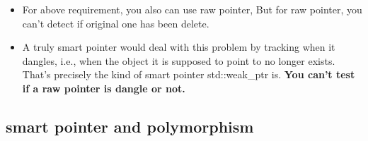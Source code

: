 \documentclass[a4paper,12pt,twoside]{book}
\begin{document}
\begin{itemize}
\item For above requirement, you also can use raw pointer, But for raw pointer, you can't detect if original one has been delete. 

\item A truly smart pointer would deal with this problem by tracking
when it dangles, i.e., when the object it is supposed to point to no longer exists. That's precisely the kind of smart pointer std::weak\_ptr is. \textbf{You can't test if a raw pointer is dangle or not.}

\end{itemize}


\subsection{smart pointer and polymorphism}
\end{document}
